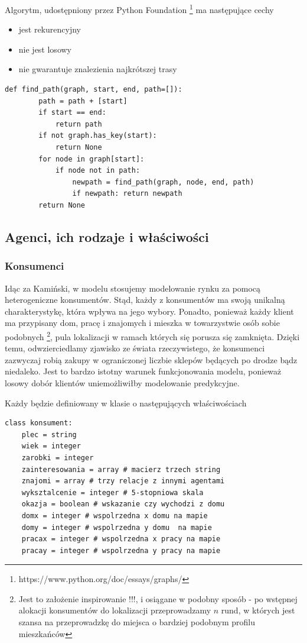 \documentclass{article}
\begin{document}
Algorytm, udostępniony przez Python Foundation \footnote{https://www.python.org/doc/essays/graphs/} ma następujące cechy

	\begin{itemize}
		\item jest rekurencyjny
		\item nie jest losowy
		\item nie gwarantuje znalezienia najkrótszej trasy
	\end{itemize}

\begin{lstlisting}[frame=single]  
    def find_path(graph, start, end, path=[]):
        path = path + [start]
        if start == end:
            return path
        if not graph.has_key(start):
            return None
        for node in graph[start]:
            if node not in path:
                newpath = find_path(graph, node, end, path)
                if newpath: return newpath
        return None
\end{lstlisting}

\subsection{Agenci, ich rodzaje i właściwości}
\subsubsection{Konsumenci} 

Idąc za Kamiński, w modelu stosujemy modelowanie rynku za pomocą heterogeniczne konsumentów. Stąd, każdy z konsumentów ma swoją unikalną charakterystykę, która wpływa na jego wybory. Ponadto, ponieważ każdy klient ma przypisany dom, pracę i znajomych i mieszka w towarzystwie osób sobie podobnych  \footnote{Jest to założenie inspirowanie !!!, i osiągane w podobny sposób - po wstępnej alokacji konsumentów do lokalizacji przeprowadzamy $n$ rund, w których jest szansa na przeprowadzkę do miejsca o bardziej podobnym profilu mieszkańców}, pula lokalizacji w ramach których się porusza się zamknięta. Dzięki temu, odwzierciedlamy zjawisko ze świata rzeczywistego, że konsumenci zazwyczaj robią zakupy w ograniczonej liczbie sklepów będących po drodze bądz niedaleko. Jest to bardzo istotny warunek funkcjonowania modelu, ponieważ losowy dobór klientów uniemożliwiłby modelowanie predykcyjne.

Każdy będzie definiowany w klasie o następujących właściwościach 

\begin{lstlisting}[frame=single]  
class konsument:   
	plec = string
	wiek = integer 
	zarobki = integer 
	zainteresowania = array # macierz trzech string 
	znajomi = array # trzy relacje z innymi agentami
	wyksztalcenie = integer # 5-stopniowa skala 
	okazja = boolean # wskazanie czy wychodzi z domu
	domx = integer # wspolrzedna x domu na mapie
	domy = integer # wspolrzedna y domu  na mapie
	pracax = integer # wspolrzedna x pracy na mapie
	pracay = integer # wspolrzedna y pracy na mapie
\end{lstlisting}
\end{document}
